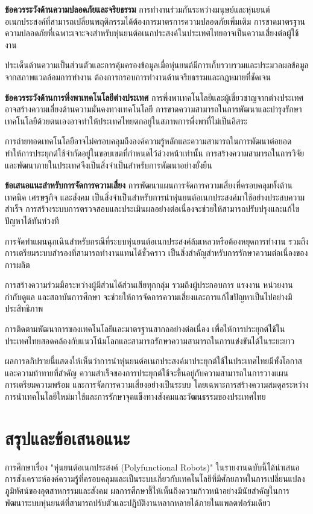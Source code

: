\documentclass[a4paper]{article}
\begin{document}
\textbf{ข้อควรระวังด้านความปลอดภัยและจริยธรรม} การทำงานร่วมกันระหว่างมนุษย์และหุ่นยนต์อเนกประสงค์ที่สามารถเปลี่ยนพฤติกรรมได้ต้องการมาตรการความปลอดภัยเพิ่มเติม การขาดมาตรฐานความปลอดภัยที่เฉพาะเจาะจงสำหรับหุ่นยนต์อเนกประสงค์ในประเทศไทยอาจเป็นความเสี่ยงต่อผู้ใช้งาน

ประเด็นด้านความเป็นส่วนตัวและการคุ้มครองข้อมูลเมื่อหุ่นยนต์มีการเก็บรวบรวมและประมวลผลข้อมูลจากสภาพแวดล้อมการทำงาน ต้องการกรอบการทำงานด้านจริยธรรมและกฎหมายที่ชัดเจน

\textbf{ข้อควรระวังด้านการพึ่งพาเทคโนโลยีต่างประเทศ} การพึ่งพาเทคโนโลยีและผู้เชี่ยวชาญจากต่างประเทศอาจสร้างความเสี่ยงด้านความมั่นคงทางเทคโนโลยี การขาดความสามารถในการพัฒนาและบำรุงรักษาเทคโนโลยีด้วยตนเองอาจทำให้ประเทศไทยตกอยู่ในสภาพการพึ่งพาที่ไม่เป็นอิสระ

การถ่ายทอดเทคโนโลยีอาจไม่ครอบคลุมถึงองค์ความรู้หลักและความสามารถในการพัฒนาต่อยอด ทำให้การประยุกต์ใช้จำกัดอยู่ในขอบเขตที่กำหนดไว้ล่วงหน้าเท่านั้น การสร้างความสามารถในการวิจัยและพัฒนาภายในประเทศจึงเป็นสิ่งจำเป็นสำหรับการพัฒนาอย่างยั่งยืน

\textbf{ข้อเสนอแนะสำหรับการจัดการความเสี่ยง} การพัฒนาแผนการจัดการความเสี่ยงที่ครอบคลุมทั้งด้านเทคนิค เศรษฐกิจ และสังคม เป็นสิ่งจำเป็นสำหรับการนำหุ่นยนต์อเนกประสงค์มาใช้อย่างประสบความสำเร็จ การสร้างระบบการตรวจสอบและประเมินผลอย่างต่อเนื่องจะช่วยให้สามารถปรับปรุงและแก้ไขปัญหาได้ทันท่วงที

การจัดทำแผนฉุกเฉินสำหรับกรณีที่ระบบหุ่นยนต์อเนกประสงค์ล้มเหลวหรือต้องหยุดการทำงาน รวมถึงการเตรียมระบบสำรองที่สามารถทำงานแทนได้ชั่วคราว เป็นสิ่งสำคัญสำหรับการรักษาความต่อเนื่องของการผลิต

การสร้างความร่วมมือระหว่างผู้มีส่วนได้ส่วนเสียทุกกลุ่ม รวมถึงผู้ประกอบการ แรงงาน หน่วยงานกำกับดูแล และสถาบันการศึกษา จะช่วยให้การจัดการความเสี่ยงและการแก้ไขปัญหาเป็นไปอย่างมีประสิทธิภาพ

การติดตามพัฒนาการของเทคโนโลยีและมาตรฐานสากลอย่างต่อเนื่อง เพื่อให้การประยุกต์ใช้ในประเทศไทยสอดคล้องกับแนวโน้มโลกและสามารถรักษาความสามารถในการแข่งขันได้ในระยะยาว

ผลการอภิปรายนี้แสดงให้เห็นว่าการนำหุ่นยนต์อเนกประสงค์มาประยุกต์ใช้ในประเทศไทยมีทั้งโอกาสและความท้าทายที่สำคัญ ความสำเร็จของการประยุกต์ใช้จะขึ้นอยู่กับความสามารถในการวางแผน การเตรียมความพร้อม และการจัดการความเสี่ยงอย่างเป็นระบบ โดยเฉพาะการสร้างความสมดุลระหว่างการนำเทคโนโลยีใหม่มาใช้และการรักษาจุดแข็งทางสังคมและวัฒนธรรมของประเทศไทย
\newpage
\section{สรุปและข้อเสนอแนะ}
การศึกษาเรื่อง "หุ่นยนต์อเนกประสงค์ (Polyfunctional Robots)" ในรายงานฉบับนี้ได้นำเสนอการสังเคราะห์องค์ความรู้ที่ครอบคลุมและเป็นระบบเกี่ยวกับเทคโนโลยีที่มีศักยภาพในการเปลี่ยนแปลงภูมิทัศน์ของอุตสาหกรรมและสังคม ผลการศึกษาชี้ให้เห็นถึงความก้าวหน้าอย่างมีนัยสำคัญในการพัฒนาระบบหุ่นยนต์ที่สามารถปรับตัวและปฏิบัติงานหลากหลายได้ภายในแพลตฟอร์มเดียว
\end{document}
